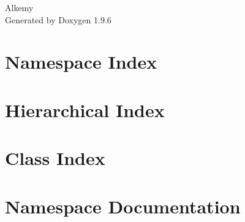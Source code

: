\documentclass[twoside]{book}
\newcommand{\+}{\discretionary{\mbox{\scriptsize$\hookleftarrow$}}{}{}}
\newcommand{\clearemptydoublepage}{%
    \newpage{\pagestyle{empty}\cleardoublepage}%
  }
\begin{document}
  \raggedbottom
    \hypersetup{pageanchor=false,
                bookmarksnumbered=true,
                pdfencoding=unicode
               }
  \begin{titlepage}
  \vspace*{7cm}
  \begin{center}%
  {\Large Alkemy}\\
  \vspace*{1cm}
  {\large Generated by Doxygen 1.9.6}\\
  \end{center}
  \end{titlepage}
  \clearemptydoublepage
  \tableofcontents
  \clearemptydoublepage
  \hypersetup{pageanchor=true}
\chapter{Namespace Index}

\chapter{Hierarchical Index}

\chapter{Class Index}

\chapter{Namespace Documentation}













\end{document}
